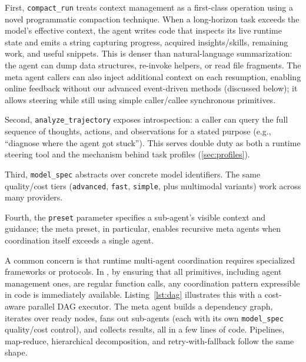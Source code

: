First, \texttt{compact\_run} treats context management as a first-class operation using a novel programmatic compaction technique. When a long-horizon task exceeds the model's effective context, the agent writes code that inspects its live runtime state and emits a string capturing progress, acquired insights/skills, remaining work, and useful snippets. This is denser than natural-language summarization: the agent can dump data structures, re-invoke helpers, or read file fragments. The meta agent callers can also inject additional context on each resumption, enabling online feedback without our advanced event-driven methods (discussed below); it allows steering while still using simple caller/callee synchronous primitives.

Second, \texttt{analyze\_trajectory} exposes introspection: a caller can query the full sequence of thoughts, actions, and observations for a stated purpose (e.g., ``diagnose where the agent got stuck''). This serves double duty as both a runtime steering tool and the mechanism behind task profiles (\cref{sec:profiles}).

Third, \texttt{model\_spec} abstracts over concrete model identifiers. The same quality/cost tiers (\texttt{advanced}, \texttt{fast}, \texttt{simple}, plus multimodal variants) work across many providers.

Fourth, the \texttt{preset} parameter specifies a sub-agent's visible context and guidance; the meta preset, in particular, enables recursive meta agents when coordination itself exceeds a single agent.


A common concern is that runtime multi-agent coordination requires specialized frameworks or protocols. In \sysname, by ensuring that all primitives, including agent management ones, are regular function calls, any coordination pattern expressible in code is immediately available. Listing~\ref{lst:dag} illustrates this with a cost-aware parallel DAG executor. The meta agent builds a dependency graph, iterates over ready nodes, fans out sub-agents (each with its own \texttt{model\_spec} quality/cost control), and collects results, all in a few lines of code. Pipelines, map-reduce, hierarchical decomposition, and retry-with-fallback follow the same shape.

